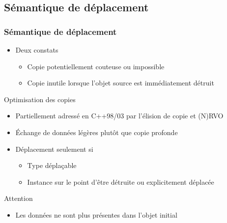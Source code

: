 \documentclass[C++.tex]{subfiles}
\begin{document}
\subsection*{Sémantique de déplacement}
\begin{frame}
	\frametitle{Sémantique de déplacement}
	\begin{itemize}
		\item Deux constats
		\begin{itemize}
			\item Copie potentiellement couteuse ou impossible


			\item Copie inutile lorsque l'objet source est immédiatement détruit
		\end{itemize}
	\end{itemize}

	\begin{block}{Optimisation des copies}
		\begin{itemize}
			\item Partiellement adressé en C++98/03 par l'élision de copie et (N)RVO
		\end{itemize}
	\end{block}

	\begin{itemize}
		\item Échange de données légères plutôt que copie profonde
		\item Déplacement seulement si
		\begin{itemize}
			\item Type déplaçable
			\item Instance sur le point d'être détruite ou explicitement déplacée
		\end{itemize}
	\end{itemize}

	\begin{alertblock}{Attention}
		\begin{itemize}
			\item Les données ne sont plus présentes dans l'objet initial
		\end{itemize}
	\end{alertblock}

\end{frame}
\end{document}
